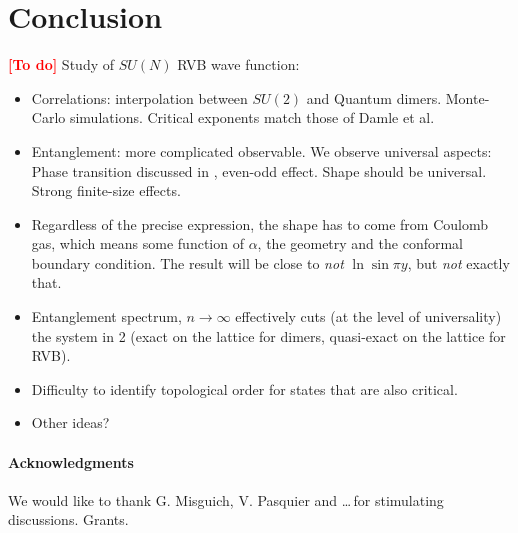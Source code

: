 \documentclass[11pt]{iopart}
\begin{document}
\section{Conclusion}
\label{sec:conclusion}
\textcolor{red}{\bf [To do]}
Study of $SU(N)$ RVB wave function:

\begin{itemize}
 \item Correlations: interpolation between $SU(2)$ and Quantum dimers. Monte-Carlo simulations. Critical exponents match those of Damle et al.
 \item Entanglement: more complicated observable. We observe universal aspects: Phase transition discussed in \cite{Stephan11}, even-odd effect. Shape should be universal. Strong finite-size effects.
 \item Regardless of the precise expression, the shape has to come from Coulomb gas, which means some function of $\alpha$, the geometry and the conformal boundary condition. The result will be close to \emph{not} $\ln \sin \pi y$, but \emph{not} exactly that. 
 \item Entanglement spectrum, $n \to \infty$ effectively cuts (at the level of universality) the system in 2 (exact on the lattice for dimers, quasi-exact on the lattice for RVB). 
 \item Difficulty to identify topological order for states that are also critical.
 \item Other ideas?
\end{itemize}

\paragraph{Acknowledgments}
 We would like to thank G. Misguich, V. Pasquier and \ldots \,for stimulating discussions. Grants. 
 \appendix
 \clearpage
\end{document}

